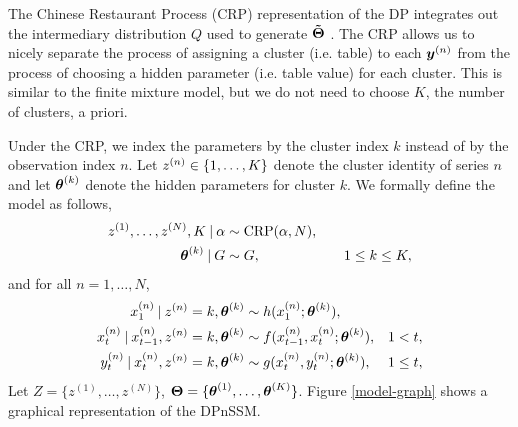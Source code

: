 \documentclass[twoside]{article}
\begin{document}
The Chinese Restaurant Process (CRP) representation of the DP integrates out the intermediary distribution $Q$ used to generate ${\bd{\tilde{\Theta}}}$ \citep{neal2000markov}.  The CRP allows us to nicely separate the process of assigning a cluster (i.e. table) to each $\bidx y n$ from the process of choosing a hidden parameter (i.e. table value) for each cluster.  This is similar to the finite mixture model, but we do not need to choose $K$, the number of clusters, a priori.

Under the CRP, we index the parameters by the cluster index $k$ instead of by the observation index $n$.  Let $\idx z n \in \{1, \ldots, K\}$ denote the cluster identity of series $n$ and let $\idx {\bd{\theta}}  k$ denote the hidden parameters for cluster $k$. We formally define the model as follows,
\begin{align} \label{crp}
\idx z 1, \ldots, \idx z N, K \given \alpha &\sim \text{CRP}(\alpha, N), \\ 
\idx {\bd{\theta}}  k \given G &\sim G, & \quad 1 \leq k \leq K, \nonumber 
\end{align}
and for all $n = 1,\ldots,N$, 
\begin{align}
{\idx[1] x n} \given \idx z n = k, \idx {\bd{\theta}} k & \sim h(\idx[1] x n; \idx {\bd{\theta}} k), \nonumber \\ 
\idx[t] x n \given \idx[t-1] x n, \idx z n = k, \idx {\bd{\theta}} k &\sim f(\idx[t-1] x n, \idx[t] x n; \idx {\bd{\theta}}  k), & 1 < t, \nonumber \\  
\idx[t] y n \given \idx[t] x n, \idx z n = k, \idx {\bd{\theta}} k &\sim g(\idx[t] x n, \idx[t] y n; \idx {\bd{\theta}}  k), & 1 \leq t, \nonumber
\end{align}   
Let $Z = \{z^{(1)},\ldots,z^{(N)}\}$, $\bd \Theta = \{\bd \theta^{(1)},\ldots,\bd \theta^{(K)}\}$.  Figure \ref{model-graph} shows a graphical representation of the DPnSSM.
\end{document}
